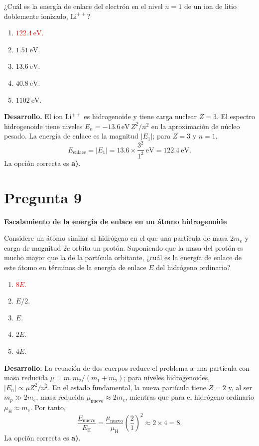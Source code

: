 \documentclass[a4paper,11pt]{article}
\newcommand{\pregunta}[2]{\section*{Pregunta #1}\textbf{#2}\par}
\begin{document}
¿Cuál es la energía de enlace del electrón en el nivel $n=1$ de un ion de litio doblemente ionizado, $\mathrm{Li}^{++}$?

\begin{enumerate}
    \item \textcolor{red}{$122.4\ \mathrm{eV}$.}
    \item $1.51\ \mathrm{eV}$.
    \item $13.6\ \mathrm{eV}$.
    \item $40.8\ \mathrm{eV}$.
    \item $1102\ \mathrm{eV}$.
\end{enumerate}

\textbf{Desarrollo.} El ion $\mathrm{Li}^{++}$ es hidrogenoide y tiene carga nuclear $Z=3$. El espectro hidrogenoide tiene niveles $E_n=-13.6\,\mathrm{eV}\,Z^2/n^2$ en la aproximación de núcleo pesado. La energía de enlace es la magnitud $|E_1|$; para $Z=3$ y $n=1$,
\[
E_{\mathrm{enlace}}=|E_1|=13.6\times\frac{3^2}{1^2}\ \mathrm{eV}=122.4\ \mathrm{eV}.
\]
La opción correcta es \textbf{a)}. \parencite[Sec. 20.4, ec. (20.69), pp. 675--676]{chaparro2026}

\pregunta{9}{Escalamiento de la energía de enlace en un átomo hidrogenoide}

Considere un átomo similar al hidrógeno en el que una partícula de masa $2m_e$ y carga de magnitud $2e$ orbita un protón. Suponiendo que la masa del protón es mucho mayor que la de la partícula orbitante, ¿cuál es la energía de enlace de este átomo en términos de la energía de enlace $E$ del hidrógeno ordinario?

\begin{enumerate}
    \item \textcolor{red}{$8E$.}
    \item $E/2$.
    \item $E$.
    \item $2E$.
    \item $4E$.
\end{enumerate}

\textbf{Desarrollo.} La ecuación de dos cuerpos reduce el problema a una partícula con masa reducida $\mu=m_1m_2/(m_1+m_2)$; para niveles hidrogenoides, $|E_n|\propto\mu Z^2/n^2$. En el estado fundamental, la nueva partícula tiene $Z=2$ y, al ser $m_p\gg2m_e$, masa reducida $\mu_{\mathrm{nuevo}}\approx2m_e$, mientras que para el hidrógeno ordinario $\mu_{\mathrm H}\approx m_e$. Por tanto,
\[
\frac{E_{\mathrm{nuevo}}}{E_{\mathrm H}}
=\frac{\mu_{\mathrm{nuevo}}}{\mu_{\mathrm H}}\left(\frac{2}{1}\right)^2
\approx2\times4=8.
\]
La opción correcta es \textbf{a)}. \parencite[Sec. 20.2, pp. 661--662; Sec. 20.4, ec. (20.69), pp. 675--676]{chaparro2026}
\end{document}
